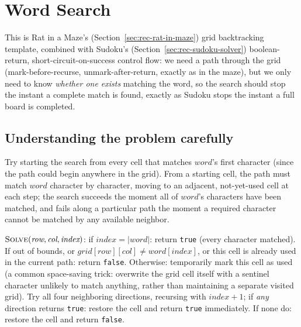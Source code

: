 \section{Word Search}
\label{sec:rec-word-search}


\begin{patternbox}
This is Rat in a Maze's (Section~\ref{sec:rec-rat-in-maze}) grid
backtracking template, combined with Sudoku's
(Section~\ref{sec:rec-sudoku-solver}) boolean-return,
short-circuit-on-success control flow: we need a path through the grid
(mark-before-recurse, unmark-after-return, exactly as in the maze), but
we only need to know \emph{whether one exists} matching the word, so the
search should stop the instant a complete match is found, exactly as
Sudoku stops the instant a full board is completed.
\end{patternbox}

\subsection*{Understanding the problem carefully}

Try starting the search from every cell that matches $\textit{word}$'s
first character (since the path could begin anywhere in the grid).
From a starting cell, the path must match $\textit{word}$ character by
character, moving to an adjacent, not-yet-used cell at each step; the
search succeeds the moment all of $\textit{word}$'s characters have been
matched, and fails along a particular path the moment a required
character cannot be matched by any available neighbor.

\begin{ideabox}
$\textsc{Solve}(\textit{row}, \textit{col}, \textit{index})$: if
$\textit{index} = |\textit{word}|$: return \texttt{true} (every
character matched). If out of bounds, or
$\textit{grid}[\textit{row}][\textit{col}] \ne \textit{word}[\textit{index}]$,
or this cell is already used in the current path: return
\texttt{false}. Otherwise: temporarily mark this cell as used (a common
space-saving trick: overwrite the grid cell itself with a sentinel
character unlikely to match anything, rather than maintaining a separate
visited grid). Try all four neighboring directions, recursing with
$\textit{index}+1$; if \emph{any} direction returns \texttt{true}: restore
the cell and return \texttt{true} immediately. If none do: restore the
cell and return \texttt{false}.
\end{ideabox}

